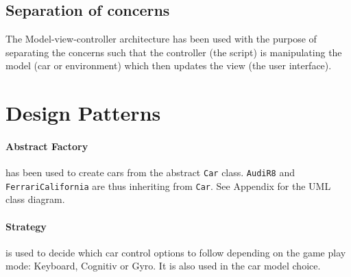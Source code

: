 \subsection{Separation of concerns}
The Model-view-controller architecture has been used with the purpose of separating the concerns such that the controller (the script) is manipulating the model (car or environment) which then updates the view (the user interface).

\section{Design Patterns}

\paragraph{Abstract Factory} has been used to create cars from the abstract \texttt{Car} class. \texttt{AudiR8} and \texttt{FerrariCalifornia} are thus inheriting from \texttt{Car}. See Appendix for the UML class diagram.

\paragraph{Strategy} is used to decide which car control options to follow depending on the game play mode: Keyboard, Cognitiv or Gyro. It is also used in the car model choice.

